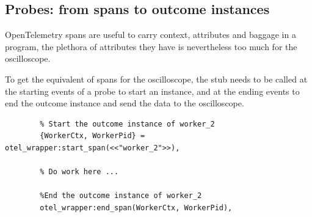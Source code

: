         
    \subsection{Probes: from spans to outcome instances}
        OpenTelemetry spans are useful to carry context, attributes and baggage in a program, the plethora of attributes they have is nevertheless too much for the oscilloscope.

        To get the equivalent of spans for the oscilloscope, the stub needs to be called at the starting events of a probe to start an instance, and at the ending events to end the outcome instance and send the data to the oscilloscope.

        \begin{verbatim}
        % Start the outcome instance of worker_2 
        {WorkerCtx, WorkerPid} = otel_wrapper:start_span(<<"worker_2">>),
        
        % Do work here ...

        %End the outcome instance of worker_2
        otel_wrapper:end_span(WorkerCtx, WorkerPid),
        \end{verbatim}
